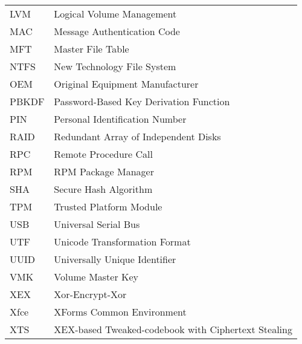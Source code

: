 \begin{longtable}{ll}
  LVM & Logical Volume Management \\
  MAC & Message Authentication Code \\
  MFT & Master File Table \\
  NTFS & New Technology File System \\
  OEM & Original Equipment Manufacturer \\
  PBKDF & Password-Based Key Derivation Function \\
  PIN & Personal Identification Number \\
  RAID & Redundant Array of Independent Disks \\
  RPC & Remote Procedure Call \\
  RPM & RPM Package Manager \\
  SHA & Secure Hash Algorithm \\
  TPM & Trusted Platform Module \\
  USB & Universal Serial Bus \\
  UTF & Unicode Transformation Format \\
  UUID & Universally Unique Identifier \\
  VMK & Volume Master Key \\
  XEX & Xor-Encrypt-Xor \\
  Xfce & XForms Common Environment \\
  XTS & XEX-based Tweaked-codebook with Ciphertext Stealing \\
\end{longtable}

